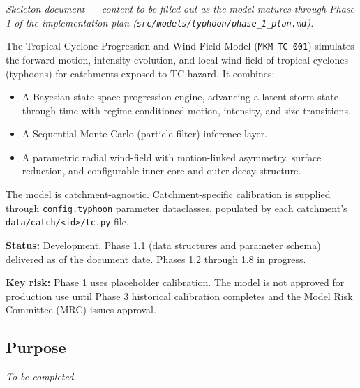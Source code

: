 \documentclass[11pt,a4paper]{article}
\begin{document}
\mkmtitlepage
\mkmlegalpage
\tableofcontents
\clearpage

\mkmexecsummary

\textit{Skeleton document — content to be filled out as the model matures
through Phase 1 of the implementation plan
(\texttt{src/models/typhoon/phase\_1\_plan.md}).}

The Tropical Cyclone Progression and Wind-Field Model (\texttt{MKM-TC-001})
simulates the forward motion, intensity evolution, and local wind field of
tropical cyclones (typhoons) for catchments exposed to TC hazard. It combines:

\begin{itemize}
  \item A Bayesian state-space progression engine, advancing a latent storm
        state through time with regime-conditioned motion, intensity, and size
        transitions.
  \item A Sequential Monte Carlo (particle filter) inference layer.
  \item A parametric radial wind-field with motion-linked asymmetry, surface
        reduction, and configurable inner-core and outer-decay structure.
\end{itemize}

The model is catchment-agnostic. Catchment-specific calibration is supplied
through \texttt{config.typhoon} parameter dataclasses, populated by each
catchment's \texttt{data/catch/<id>/tc.py} file.

\textbf{Status:} Development. Phase 1.1 (data structures and parameter schema)
delivered as of the document date. Phases 1.2 through 1.8 in progress.

\textbf{Key risk:} Phase 1 uses placeholder calibration. The model is not
approved for production use until Phase 3 historical calibration completes
and the Model Risk Committee (MRC) issues approval.

\mkmpurpose

\subsection{Purpose}

\textit{To be completed.}
\end{document}
